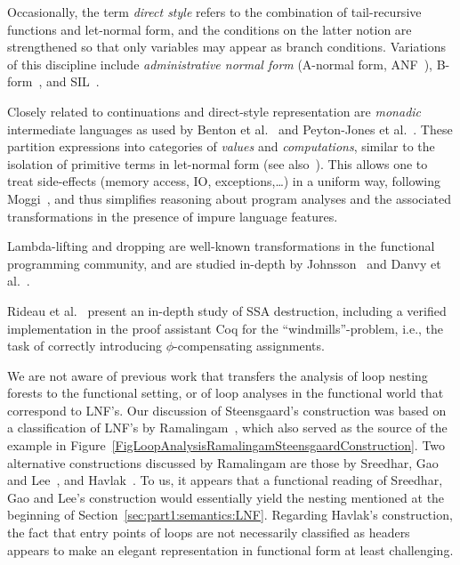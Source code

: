 
Occasionally, the term \emph{direct style} refers to the combination
of tail-recursive functions and let-normal form, and the conditions on
the latter notion are strengthened so that only variables may appear
as branch conditions. Variations of this discipline include
\emph{administrative normal form} (A-normal form,
ANF~\cite{DBLP:conf/pldi/FlanaganSDF93}),
B-form~\cite{DBLP:conf/pldi/TarditiMCSHL96}, and
SIL~\cite{DBLP:journals/jfp/TolmachO98}.

Closely related to continuations and direct-style representation are
\emph{monadic} intermediate languages as used by Benton et
al.~\cite{BentonKennedyRussel:ICFP1998} and Peyton-Jones et
al.~\cite{PeytonJonesShieldsLT:POPL1998}. These partition expressions
into categories of \emph{values} and
\emph{computations}, similar to the isolation of primitive terms in
let-normal form (see also~\cite{Reynolds1974,Plotkin75}). This allows
one to treat side-effects (memory access, IO, exceptions,\ldots) in a
uniform way, following Moggi~\cite{Moggi1991}, and thus simplifies
reasoning about program analyses and the associated transformations in
the presence of impure language features.

Lambda-lifting and dropping are well-known transformations in the
functional programming community, and are studied in-depth by
Johnsson~\cite{DBLP:conf/fpca/Johnsson85} and Danvy et
al.~\cite{DBLP:journals/tcs/DanvyS00}.

Rideau et al.~\cite{DBLP:journals/jar/RideauSL08} present an in-depth
study of SSA destruction, including a verified implementation in the
proof assistant Coq for the ``windmills''-problem, i.e., the task of
correctly introducing $\phi$-compensating assignments.

We are not aware of previous work that transfers the analysis of loop
nesting forests to the functional setting, or of loop analyses in the
functional world that correspond to LNF's.  Our discussion of
Steensgaard's construction was based on a classification of LNF's by
Ramalingam~\cite{DBLP:journals/toplas/Ramalingam02}, which also served
as the source of the example in
Figure~\ref{FigLoopAnalysisRamalingamSteensgaardConstruction}.  Two
alternative constructions discussed by Ramalingam are those by
Sreedhar, Gao and Lee~\cite{DBLP:journals/toplas/SreedharGL96}, and
Havlak~\cite{DBLP:journals/toplas/Havlak97}.  To us, it appears that a
functional reading of Sreedhar, Gao and Lee's construction would
essentially yield the nesting mentioned at the beginning of
Section~\ref{sec:part1:semantics:LNF}. Regarding Havlak's
construction, the fact that entry points of loops are not necessarily
classified as headers appears to make an elegant representation in
functional form at least challenging.

